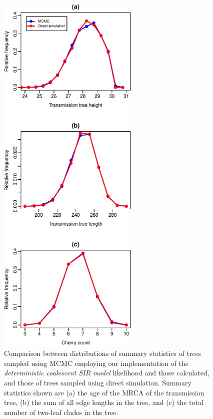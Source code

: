 \documentclass[10pt]{article}
\newcommand{\beginsupplement}{%
        \setcounter{table}{0}
        \renewcommand{\thetable}{S\arabic{table}}%
        \setcounter{figure}{0}
        \renewcommand{\thefigure}{S\arabic{figure}}%
     }
\begin{document}
\beginsupplement
\begin{figure}
  \vspace{-3cm}

    \begin{center}
      \includegraphics[width=0.6\textwidth]{detCoalFigure-crop.pdf}
    \end{center}
    \caption{Comparison between distributions of summary statistics of
      trees sampled using MCMC employing our implementation of the
      \emph{deterministic coalescent SIR model} likelihood and those
      calculated, and those of trees sampled using direct
      simulation. Summary statistics shown are (a) the age of the MRCA
      of the transmission tree, (b) the sum of all edge lengths in the
      tree, and (c) the total number of two-leaf clades in the tree.}
    \label{fig:detCoalValidation}
\end{figure}
\end{document}
